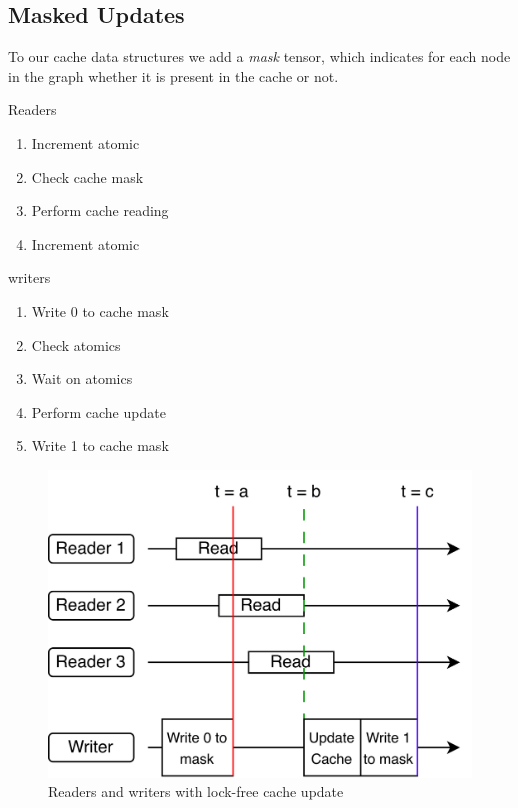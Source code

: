 \subsection{Masked Updates}
To our cache data structures we add a \textit{mask} tensor, which indicates for each node in the graph whether it is present in the cache or not. 

Readers
\begin{enumerate}
    \item Increment atomic
    \item Check cache mask
    \item Perform cache reading
    \item Increment atomic
\end{enumerate}

writers
\begin{enumerate}
    \item Write 0 to cache mask
    \item Check atomics
    \item Wait on atomics
    \item Perform cache update
    \item Write 1 to cache mask
\end{enumerate}

\begin{figure}[h!]
    \centering
    \includegraphics[width=\textwidth]{diagrams/group_meeting_gnn-Multi-GPU.png}
    
    \caption{Readers and writers with lock-free cache update}
    \label{Design: Lock-free update diagram}
\end{figure}    

